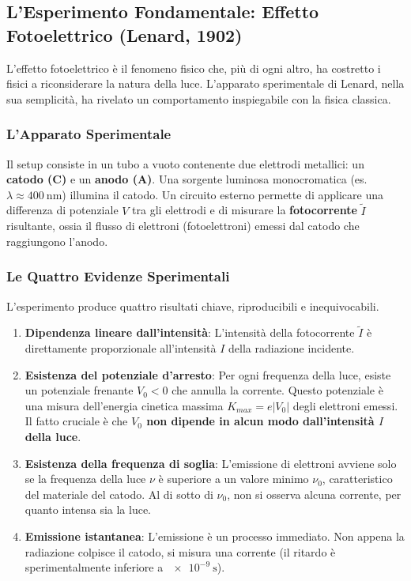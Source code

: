 \subsection{L'Esperimento Fondamentale: Effetto Fotoelettrico (Lenard, 1902)}

L'effetto fotoelettrico è il fenomeno fisico che, più di ogni altro, ha costretto i fisici a riconsiderare la natura della luce. L'apparato sperimentale di Lenard, nella sua semplicità, ha rivelato un comportamento inspiegabile con la fisica classica.

\subsubsection*{L'Apparato Sperimentale}
Il setup consiste in un tubo a vuoto contenente due elettrodi metallici: un \textbf{catodo (C)} e un \textbf{anodo (A)}. Una sorgente luminosa monocromatica (es. $\lambda \approx \SI{400}{\nano\meter}$) illumina il catodo. Un circuito esterno permette di applicare una differenza di potenziale $V$ tra gli elettrodi e di misurare la \textbf{fotocorrente} $\tilde{I}$ risultante, ossia il flusso di elettroni (fotoelettroni) emessi dal catodo che raggiungono l'anodo.

\subsubsection*{Le Quattro Evidenze Sperimentali}
L'esperimento produce quattro risultati chiave, riproducibili e inequivocabili.
\begin{enumerate}
    \item \textbf{Dipendenza lineare dall'intensità}: L'intensità della fotocorrente $\tilde{I}$ è direttamente proporzionale all'intensità $I$ della radiazione incidente.
    \item \textbf{Esistenza del potenziale d'arresto}: Per ogni frequenza della luce, esiste un potenziale frenante $V_0 < 0$ che annulla la corrente. Questo potenziale è una misura dell'energia cinetica massima $K_{max} = e|V_0|$ degli elettroni emessi. Il fatto cruciale è che \textbf{$V_0$ non dipende in alcun modo dall'intensità $I$ della luce}.
    \item \textbf{Esistenza della frequenza di soglia}: L'emissione di elettroni avviene solo se la frequenza della luce $\nu$ è superiore a un valore minimo $\nu_0$, caratteristico del materiale del catodo. Al di sotto di $\nu_0$, non si osserva alcuna corrente, per quanto intensa sia la luce.
    \item \textbf{Emissione istantanea}: L'emissione è un processo immediato. Non appena la radiazione colpisce il catodo, si misura una corrente (il ritardo è sperimentalmente inferiore a $\SI{e-9}{\second}$).
\end{enumerate}

